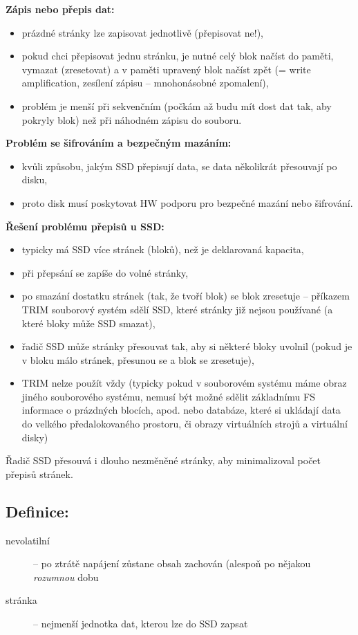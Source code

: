 \documentclass[a4paper, 11pt]{article}
\begin{document}
\textbf{Zápis nebo přepis dat:}
\begin{itemize}
    \item prázdné stránky lze zapisovat jednotlivě (přepisovat ne!),
    \item pokud chci přepisovat jednu stránku, je nutné celý blok načíst do paměti, vymazat (zresetovat) a v paměti upravený blok načíst zpět (= write amplification, zesílení zápisu -- mnohonásobné zpomalení),
    \item problém je menší při sekvenčním (počkám až budu mít dost dat tak, aby pokryly blok) než při náhodném zápisu do souboru.
\end{itemize}
 
\textbf{Problém se šifrováním a bezpečným mazáním:}
\begin{itemize}
    \item kvůli způsobu, jakým SSD přepisují data, se data několikrát přesouvají po disku,
    \item proto disk musí poskytovat HW podporu pro bezpečné mazání nebo šifrování.
\end{itemize}
 
\textbf{Řešení problému přepisů u SSD:}
\begin{itemize}
    \item typicky má SSD více stránek (bloků), než je deklarovaná kapacita,
    \item při přepsání se zapíše do volné stránky,
    \item po smazání dostatku stránek (tak, že tvoří blok) se blok zresetuje -- příkazem TRIM souborový systém sdělí SSD, které stránky již nejsou používané (a které bloky může SSD smazat),
    \item řadič SSD může stránky přesouvat tak, aby si některé bloky uvolnil (pokud je v bloku málo stránek, přesunou se a blok se zresetuje),
    \item TRIM nelze použít vždy (typicky pokud v souborovém systému máme obraz jiného souborového systému, nemusí být možné sdělit základnímu FS informace o prázdných blocích, apod. nebo databáze, které si ukládají data do velkého předalokovaného prostoru, či obrazy virtuálních strojů a virtuální disky)
\end{itemize}

Řadič SSD přesouvá i dlouho nezměněné stránky, aby minimalizoval počet přepisů stránek.

\subsection*{Definice:}
\begin{description}
\item[nevolatilní] -- po ztrátě napájení zůstane obsah zachován (alespoň po nějakou \textit{rozumnou} dobu
\item[stránka] -- nejmenší jednotka dat, kterou lze do SSD zapsat
\end{description}
\end{document}
